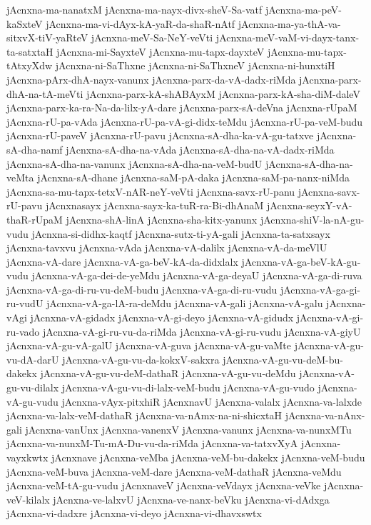 {jAcnxna-ma-nanatxM
jAcnxna-ma-nayx-divx-sheV-Sa-vatf
jAcnxna-ma-peV-kaSxteV
jAcnxna-ma-vi-dAyx-kA-yaR-da-shaR-nAtf
jAcnxna-ma-ya-thA-va-sitxvX-tiV-yaRteV
jAcnxna-meV-Sa-NeY-veVti
jAcnxna-meV-vaM-vi-dayx-tanx-ta-satxtaH
jAcnxna-mi-SayxteV
jAcnxna-mu-tapx-dayxteV
jAcnxna-mu-tapx-tAtxyXdw
jAcnxna-ni-SaThxne
jAcnxna-ni-SaThxneV
jAcnxna-ni-hunxtiH
jAcnxna-pArx-dhA-nayx-vanunx
jAcnxna-parx-da-vA-dadx-riMda
jAcnxna-parx-dhA-na-tA-meVti
jAcnxna-parx-kA-shABAyxM
jAcnxna-parx-kA-sha-diM-daleV
jAcnxna-parx-ka-ra-Na-da-lilx-yA-dare
jAcnxna-parx-sA-deVna
jAcnxna-rUpaM
jAcnxna-rU-pa-vAda
jAcnxna-rU-pa-vA-gi-didx-teMdu
jAcnxna-rU-pa-veM-budu
jAcnxna-rU-paveV
jAcnxna-rU-pavu
jAcnxna-sA-dha-ka-vA-gu-tatxve
jAcnxna-sA-dha-namf
jAcnxna-sA-dha-na-vAda
jAcnxna-sA-dha-na-vA-dadx-riMda
jAcnxna-sA-dha-na-vanunx
jAcnxna-sA-dha-na-veM-budU
jAcnxna-sA-dha-na-veMta
jAcnxna-sA-dhane
jAcnxna-saM-pA-daka
jAcnxna-saM-pa-nanx-niMda
jAcnxna-sa-mu-tapx-tetxV-nAR-neY-veVti
jAcnxna-savx-rU-panu
jAcnxna-savx-rU-pavu
jAcnxnasayx
jAcnxna-sayx-ka-tuR-ra-Bi-dhAnaM
jAcnxna-seyxY-vA-thaR-rUpaM
jAcnxna-shA-linA
jAcnxna-sha-kitx-yanunx
jAcnxna-shiV-la-nA-gu-vudu
jAcnxna-si-didhx-kaqtf
jAcnxna-sutx-ti-yA-gali
jAcnxna-ta-satxsayx
jAcnxna-tavxvu
jAcnxna-vAda
jAcnxna-vA-dalilx
jAcnxna-vA-da-meVlU
jAcnxna-vA-dare
jAcnxna-vA-ga-beV-kA-da-didxlalx
jAcnxna-vA-ga-beV-kA-gu-vudu
jAcnxna-vA-ga-dei-de-yeMdu
jAcnxna-vA-ga-deyaU
jAcnxna-vA-ga-di-ruva
jAcnxna-vA-ga-di-ru-vu-deM-budu
jAcnxna-vA-ga-di-ru-vudu
jAcnxna-vA-ga-gi-ru-vudU
jAcnxna-vA-ga-lA-ra-deMdu
jAcnxna-vA-gali
jAcnxna-vA-galu
jAcnxna-vAgi
jAcnxna-vA-gidadx
jAcnxna-vA-gi-deyo
jAcnxna-vA-gidudx
jAcnxna-vA-gi-ru-vado
jAcnxna-vA-gi-ru-vu-da-riMda
jAcnxna-vA-gi-ru-vudu
jAcnxna-vA-giyU
jAcnxna-vA-gu-vA-galU
jAcnxna-vA-guva
jAcnxna-vA-gu-vaMte
jAcnxna-vA-gu-vu-dA-darU
jAcnxna-vA-gu-vu-da-kokxV-sakxra
jAcnxna-vA-gu-vu-deM-bu-dakekx
jAcnxna-vA-gu-vu-deM-dathaR
jAcnxna-vA-gu-vu-deMdu
jAcnxna-vA-gu-vu-dilalx
jAcnxna-vA-gu-vu-di-lalx-veM-budu
jAcnxna-vA-gu-vudo
jAcnxna-vA-gu-vudu
jAcnxna-vAyx-pitxhiR
jAcnxnavU
jAcnxna-valalx
jAcnxna-va-lalxde
jAcnxna-va-lalx-veM-dathaR
jAcnxna-va-nAmx-na-ni-shicxtaH
jAcnxna-va-nAnx-gali
jAcnxna-vanUnx
jAcnxna-vanenxV
jAcnxna-vanunx
jAcnxna-va-nunxMTu
jAcnxna-va-nunxM-Tu-mA-Du-vu-da-riMda
jAcnxna-va-tatxvXyA
jAcnxna-vayxkwtx
jAcnxnave
jAcnxna-veMba
jAcnxna-veM-bu-dakekx
jAcnxna-veM-budu
jAcnxna-veM-buva
jAcnxna-veM-dare
jAcnxna-veM-dathaR
jAcnxna-veMdu
jAcnxna-veM-tA-gu-vudu
jAcnxnaveV
jAcnxna-veVdayx
jAcnxna-veVke
jAcnxna-veV-kilalx
jAcnxna-ve-lalxvU
jAcnxna-ve-nanx-beVku
jAcnxna-vi-dAdxga
jAcnxna-vi-dadxre
jAcnxna-vi-deyo
jAcnxna-vi-dhavxswtx
}
